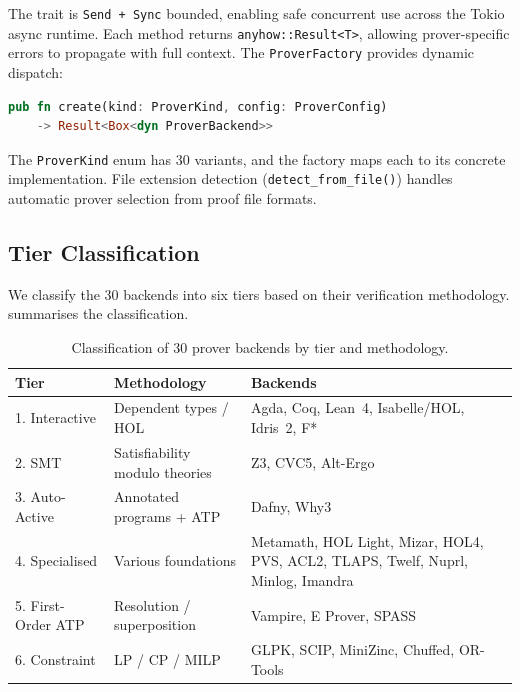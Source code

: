 \documentclass[11pt,a4paper]{article}
\begin{document}
The trait is \texttt{Send + Sync} bounded, enabling safe concurrent use across
the Tokio async runtime. Each method returns \texttt{anyhow::Result<T>},
allowing prover-specific errors to propagate with full context. The
\texttt{ProverFactory} provides dynamic dispatch:

\begin{lstlisting}[language=Rust,caption={Factory-based prover instantiation.},label=lst:factory]
pub fn create(kind: ProverKind, config: ProverConfig)
    -> Result<Box<dyn ProverBackend>>
\end{lstlisting}

The \texttt{ProverKind} enum has 30 variants, and the factory maps each to its
concrete implementation. File extension detection
(\texttt{detect\_from\_file()}) handles automatic prover selection from proof
file formats.

\subsection{Tier Classification}

We classify the 30 backends into six tiers based on their verification
methodology.  summarises the classification.

\begin{table}[htbp]
\centering
\caption{Classification of 30 prover backends by tier and methodology.}
\label{tab:tiers}
\small
\begin{tabular}{@{}llp{6.5cm}@{}}
\toprule
\textbf{Tier} & \textbf{Methodology} & \textbf{Backends} \\
\midrule
1. Interactive & Dependent types / HOL &
  Agda, Coq, Lean~4, Isabelle/HOL, Idris~2, F* \\
2. SMT & Satisfiability modulo theories &
  Z3, CVC5, Alt-Ergo \\
3. Auto-Active & Annotated programs + ATP &
  Dafny, Why3 \\
4. Specialised & Various foundations &
  Metamath, HOL Light, Mizar, HOL4, PVS, ACL2, TLAPS, Twelf, Nuprl, Minlog,
  Imandra \\
5. First-Order ATP & Resolution / superposition &
  Vampire, E Prover, SPASS \\
6. Constraint & LP / CP / MILP &
  GLPK, SCIP, MiniZinc, Chuffed, OR-Tools \\
\bottomrule
\end{tabular}
\end{table}
\end{document}
